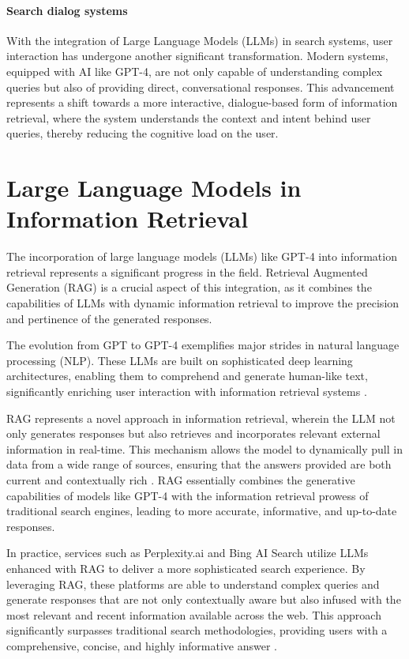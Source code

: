 \documentclass{article}
\begin{document}
\paragraph{Search dialog systems} With the integration of Large Language Models (LLMs) in search systems, user interaction has undergone another significant transformation. Modern systems, equipped with AI like GPT-4, are not only capable of understanding complex queries but also of providing direct, conversational responses. This advancement represents a shift towards a more interactive, dialogue-based form of information retrieval, where the system understands the context and intent behind user queries, thereby reducing the cognitive load on the user.

\section{Large Language Models in Information Retrieval}

The incorporation of large language models (LLMs) like GPT-4 into information retrieval represents a significant progress in the field. Retrieval Augmented Generation (RAG) is a crucial aspect of this integration, as it combines the capabilities of LLMs with dynamic information retrieval to improve the precision and pertinence of the generated responses.

The evolution from GPT to GPT-4 exemplifies major strides in natural language processing (NLP). These LLMs are built on sophisticated deep learning architectures, enabling them to comprehend and generate human-like text, significantly enriching user interaction with information retrieval systems \citep{brown2020language}.

RAG represents a novel approach in information retrieval, wherein the LLM not only generates responses but also retrieves and incorporates relevant external information in real-time. This mechanism allows the model to dynamically pull in data from a wide range of sources, ensuring that the answers provided are both current and contextually rich \citep{lewis2020retrieval}. RAG essentially combines the generative capabilities of models like GPT-4 with the information retrieval prowess of traditional search engines, leading to more accurate, informative, and up-to-date responses.

In practice, services such as Perplexity.ai \citep{PerplexityAI2023} and Bing AI Search \citep{BingAI2023} utilize LLMs enhanced with RAG to deliver a more sophisticated search experience. By leveraging RAG, these platforms are able to understand complex queries and generate responses that are not only contextually aware but also infused with the most relevant and recent information available across the web. This approach significantly surpasses traditional search methodologies, providing users with a comprehensive, concise, and highly informative answer \citep{fostikov2023first}.
\end{document}
